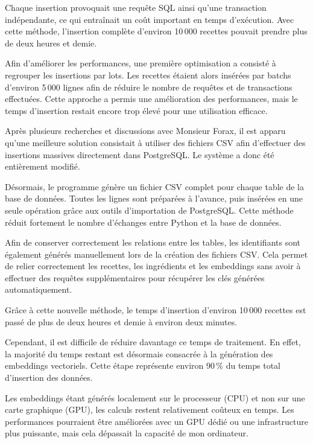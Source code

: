 \documentclass[12pt]{article}
\begin{document}
            Chaque insertion provoquait une requête SQL ainsi qu’une transaction indépendante, ce qui entraînait un coût important en temps d’exécution.
            Avec cette méthode, l’insertion complète d’environ 10\,000 recettes pouvait prendre plus de deux heures et demie.

            Afin d’améliorer les performances, une première optimisation a consisté à regrouper les insertions par lots.
            Les recettes étaient alors insérées par batchs d’environ 5\,000 lignes afin de réduire le nombre de requêtes et de transactions effectuées.
            Cette approche a permis une amélioration des performances, mais le temps d’insertion restait encore trop élevé pour une utilisation efficace.

            Après plusieurs recherches et discussions avec Monsieur Forax, il est apparu qu’une meilleure solution consistait à utiliser des fichiers CSV afin d’effectuer des insertions massives directement dans PostgreSQL.
            Le système a donc été entièrement modifié.

            Désormais, le programme génère un fichier CSV complet pour chaque table de la base de données.
            Toutes les lignes sont préparées à l’avance, puis insérées en une seule opération grâce aux outils d’importation de PostgreSQL.
            Cette méthode réduit fortement le nombre d’échanges entre Python et la base de données.

            Afin de conserver correctement les relations entre les tables, les identifiants sont également générés manuellement lors de la création des fichiers CSV.
            Cela permet de relier correctement les recettes, les ingrédients et les embeddings sans avoir à effectuer des requêtes supplémentaires pour récupérer les clés générées automatiquement.

            Grâce à cette nouvelle méthode, le temps d’insertion d’environ 10\,000 recettes est passé de plus de deux heures et demie à environ deux minutes.

            Cependant, il est difficile de réduire davantage ce temps de traitement.
            En effet, la majorité du temps restant est désormais consacrée à la génération des embeddings vectoriels.
            Cette étape représente environ 90\,\% du temps total d’insertion des données.

            Les embeddings étant générés localement sur le processeur (CPU) et non sur une carte graphique (GPU), les calculs restent relativement coûteux en temps.
            Les performances pourraient être améliorées avec un GPU dédié ou une infrastructure plus puissante, mais cela dépassait la capacité de mon ordinateur.
\end{document}
